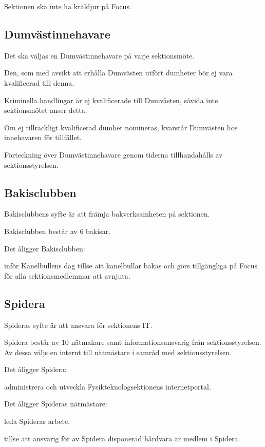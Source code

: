 \documentclass{styrdokument}
\begin{document}
\? Sektionen ska inte ha kräldjur på Focus.

\subsection{Dumvästinnehavare}
\? Det ska väljas en Dumvästinnehavare på varje sektionsmöte.

\? Den, som med avsikt att erhålla Dumvästen utfört dumheter bör ej vara kvalificerad till denna.
		
\? Kriminella handlingar är ej kvalificerade till Dumvästen, såvida inte sektionsmötet anser detta.
		
\? Om ej tillräckligt kvalificerad dumhet nomineras, kvarstår Dumvästen hos innehavaren för tillfället.
		
\? Förteckning över Dumvästinnehavare genom tiderna tillhandahålls av sektionsstyrelsen.

\subsection{Bakisclubben}
\? Bakisclubbens syfte är att främja bakverksamheten på sektionen.

\? Bakisclubben består av 6 bakisar.

\? Det åligger Bakisclubben:
\begin{aligganden}
    \item inför Kanelbullens dag tillse att kanelbullar bakas och görs tillgängliga på Focus för alla sektionsmedlemmar att avnjuta.
\end{aligganden}

\subsection{Spidera}
\? Spideras syfte är att ansvara för sektionens IT.

\? Spidera består av 10 nätmakare samt informationsansvarig från sektionsstyrelsen.
Av dessa väljs en internt till nätmästare i samråd med sektionsstyrelsen.

\? Det åligger Spidera:
\begin{aligganden}
    \item administrera och utveckla Fysikteknologsektionens internetportal.
\end{aligganden}

\? Det åligger Spideras nätmästare:
\begin{aligganden}
	\item leda Spideras arbete.
    \item tillse att ansvarig för av Spidera disponerad hårdvara är medlem i Spidera.
\end{aligganden}
\end{document}
